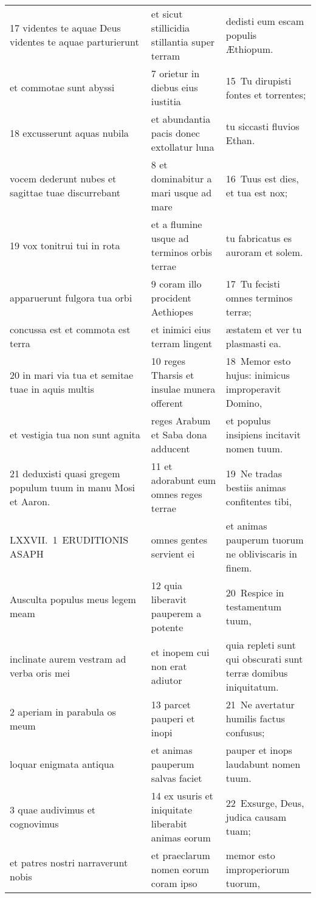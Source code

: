 \documentclass{article}
\begin{document}
\begin{longtable}{@{}p{}p{}p{}@{}}
17 videntes te aquae Deus videntes te aquae parturierunt	&	et sicut stillicidia stillantia super terram	&	dedisti eum escam populis Æthiopum.	\\
et commotae sunt abyssi	&	7 orietur in diebus eius iustitia	&	15 Tu dirupisti fontes et torrentes;	\\
18 excusserunt aquas nubila	&	et abundantia pacis donec extollatur luna	&	tu siccasti fluvios Ethan.	\\
vocem dederunt nubes et sagittae tuae discurrebant	&	8 et dominabitur a mari usque ad mare	&	16 Tuus est dies, et tua est nox;	\\
19 vox tonitrui tui in rota	&	et a flumine usque ad terminos orbis terrae	&	tu fabricatus es auroram et solem.	\\
apparuerunt fulgora tua orbi	&	9 coram illo procident Aethiopes	&	17 Tu fecisti omnes terminos terræ;	\\
concussa est et commota est terra	&	et inimici eius terram lingent	&	æstatem et ver tu plasmasti ea.	\\
20 in mari via tua et semitae tuae in aquis multis	&	10 reges Tharsis et insulae munera offerent	&	18 Memor esto hujus: inimicus improperavit Domino,	\\
et vestigia tua non sunt agnita	&	reges Arabum et Saba dona adducent	&	et populus insipiens incitavit nomen tuum.	\\
21 deduxisti quasi gregem populum tuum in manu Mosi et Aaron.	&	11 et adorabunt eum omnes reges terrae	&	19 Ne tradas bestiis animas confitentes tibi,	\\
LXXVII. 1 ERUDITIONIS ASAPH	&	omnes gentes servient ei	&	et animas pauperum tuorum ne obliviscaris in finem.	\\
Ausculta populus meus legem meam	&	12 quia liberavit pauperem a potente	&	20 Respice in testamentum tuum,	\\
inclinate aurem vestram ad verba oris mei	&	et inopem cui non erat adiutor	&	quia repleti sunt qui obscurati sunt terræ domibus iniquitatum.	\\
2 aperiam in parabula os meum	&	13 parcet pauperi et inopi	&	21 Ne avertatur humilis factus confusus;	\\
loquar enigmata antiqua	&	et animas pauperum salvas faciet	&	pauper et inops laudabunt nomen tuum.	\\
3 quae audivimus et cognovimus	&	14 ex usuris et iniquitate liberabit animas eorum	&	22 Exsurge, Deus, judica causam tuam;	\\
et patres nostri narraverunt nobis	&	et praeclarum nomen eorum coram ipso	&	memor esto improperiorum tuorum,	\\

\end{longtable}
\end{document}
